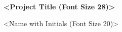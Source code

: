 
\title{}
\date{}
\author{}

\begin{titlepage}
    \begin{center}
    \vspace*{4cm}

    {\fontsize{28pt}{33.6pt}\selectfont
    \textbf{\textless Project Title (Font Size 28)\textgreater{}}
    }
    \vspace{16cm}
    
    {\fontsize{20pt}{24pt}\selectfont
    \textless Name with Initials (Font Size 20)\textgreater{}
    }
    
    \end{center}
    \thispagestyle{empty}
\end{titlepage}



